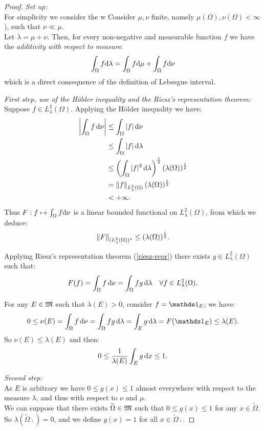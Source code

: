 \begin{proof}
	
	\textit{Set up:}\\
	For simplicity we consider the w
	Consider $\mu, \nu$ finite, namely $\mu(\Omega), \nu(\Omega) < \infty$), such that $\nu \ll \mu$.\\
	Let $\lambda = \mu + \nu$. Then, for every non-negative and measurable function $f$ we have the \emph{additivity with respect to measure}:
	$$\int_\Omega f \mathrm d \lambda = \int_\Omega f \mathrm d \mu + \int_\Omega f \mathrm d \nu$$
	which is a direct consequence of the definition of Lebesgue interval.
	
	\textit{First step, use of the Hölder inequality and the Riesz's representation theorem:}\\
	Suppose $f \in L^2_\lambda(\Omega)$. Applying the Hölder inequality we have:
	\begin{align*}
	\left\lvert\int_\Omega f \, \mathrm d \nu\right\rvert
	&\leq \int_\Omega |f| \, \mathrm d \nu\\
	&\leq \int_\Omega |f| \, \mathrm d \lambda\\
	&\leq \left( \int_\Omega |f|^2 \, \mathrm d \lambda \right)^{\frac 1 2}(\lambda(\Omega))^\frac{1}{2}\\
	&= \left\lVert f\right\rVert_{L^2_\lambda (\Omega)}(\lambda(\Omega))^\frac{1}{2}\\
	&< +\infty
	.
	\end{align*}
	Thus $F: f \mapsto \int_\Omega f \mathrm d \nu$ is a linear bounded functional on $L^2_\lambda(\Omega)$, from which we deduce:
	$$\left\lVert F\right\rVert_{(L^2_\lambda (\Omega))^\star} \leq (\lambda(\Omega))^\frac{1}{2}.$$
	
	Applying Riesz's representation theorem (\vref{riesz-repr}) there exists $g \in L^2_\lambda(\Omega)$ such that:
	$$ F(f) = \int_\Omega f \,\mathrm d \nu = \int_\Omega f g \, \mathrm d \lambda \quad \forall f \in L^2_\lambda(\Omega).$$
	
	For any $E \in \mathfrak M$ such that $\lambda(E) > 0$, consider $f = \Ind_E$; we have:
	$$ 0 
	\leq \nu(E) 
	= \int_\Omega f \,\dnu 
	= \int_\Omega f g \, \dlam 
	= \int_E g \, \dlam
	= F(\Ind_E)
	\leq \lambda(E)
	.
	$$
	So $\nu(E) \leq \lambda(E)$ and then:
	$$0 \leq \frac{1}{\lambda(E)} \int_E g \, \mathrm d x \leq 1.$$
	
	\textit{Second step:}\\
	As $E$ is arbitrary we have $ 0 \leq g(x) \leq 1$ almost everywhere with respect to the measure $\lambda$, and thus with respect to $\nu$ and $\mu$.\\
	We can suppose that there exists $\widetilde \Omega \in \mathfrak M$ such that $0 \leq g(x) \leq 1$  for any $x \in \tilde\Omega$.\\
	So $\lambda(\tilde\Omega\comp) = 0$, and we define $g(x) = 1$ for all $x \in \tilde\Omega\comp$.
	

\end{proof}

